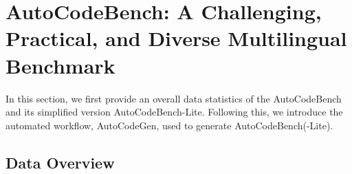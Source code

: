 

 


 


 






\section{AutoCodeBench: A Challenging, Practical, and Diverse Multilingual Benchmark}

In this section, we first provide an overall data statistics of the AutoCodeBench and its simplified version AutoCodeBench-Lite. Following this, we introduce the automated workflow, AutoCodeGen, used to generate AutoCodeBench(-Lite). 

\subsection{Data Overview}

